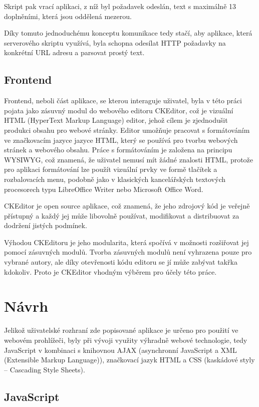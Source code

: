 \documentclass[a4paper,11pt]{article}
\newcommand{\td}[2][]{
	{\todo[size=\footnotesize]{#2}}
}
\begin{document}
Skript pak vrací aplikaci, z níž byl požadavek odeslán, text s \td{empiricky overeno}maximálně 13 doplněními, která jsou oddělená mezerou.

Díky tomuto jednoduchému konceptu komunikace tedy stačí, aby aplikace, která serverového skriptu využívá, byla schopna odesílat HTTP požadavky na konkrétní URL adresu a parsovat prostý text. 

\subsection{Frontend}

Frontend, neboli část aplikace, se kterou interaguje uživatel, byla v této práci pojata jako zásuvný modul do webového editoru CKEditor, což je vizuální HTML (HyperText Markup Language) editor, jehož cílem je zjednodušit produkci obsahu pro webové stránky. Editor umožňuje pracovat s formátováním ve značkovacím jazyce jazyce HTML, který se používá pro tvorbu webových stránek a webového obsahu. Práce s formátováním je založena na principu WYSIWYG, což znamená, že uživatel nemusí mít žádné znalosti HTML, protože pro aplikaci formátování lze použít vizuální prvky ve formě tlačítek a rozbalovacích menu, podobně jako v klasických kancelářských textových procesorech typu LibreOffice Writer nebo Microsoft Office Word.

CKEditor je open source aplikace, což znamená, že jeho zdrojový kód je veřejně přístupný a každý jej může libovolně používat, modifikovat a distribuovat za dodržení jistých podmínek. 

Výhodou CKEditoru je jeho modularita, která spočívá v možnosti rozšiřovat jej pomocí zásuvných modulů. Tvorba zásuvných modulů není vyhrazena pouze pro vybrané autory, ale  díky otevřenosti kódu editoru se jí může zabývat takřka kdokoliv. Proto je CKEditor vhodným výběrem pro účely této práce. %

\section{Návrh}

Jelikož uživatelské rozhraní zde popisované aplikace je určeno pro použití ve webovém prohlížeči, byly při vývoji využity výhradně webové technologie, tedy JavaScript v kombinaci s knihovnou AJAX (asynchronní JavaScript a XML (Extensible Markup Language)), značkovací jazyk HTML a CSS (kaskádové styly -- Cascading Style Sheets). 

\subsection{JavaScript}
\end{document}
